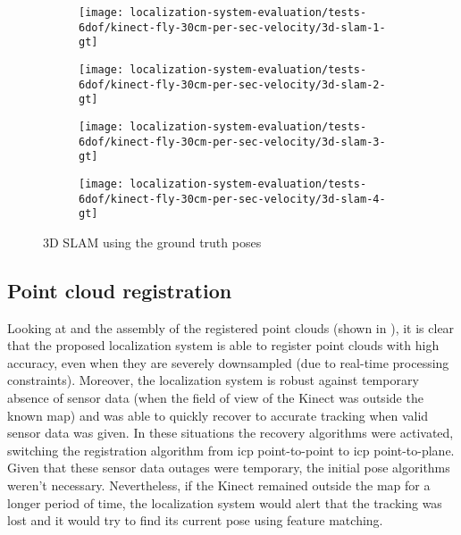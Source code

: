 \begin{figure}[H]
	\centering
	\begin{subfigure}[ht]{0.45\textwidth}
		\centering
		\texttt{[image: localization-system-evaluation/tests-6dof/kinect-fly-30cm-per-sec-velocity/3d-slam-1-gt]}
	\end{subfigure}
	\begin{subfigure}[ht]{0.45\textwidth}
		\centering
		\texttt{[image: localization-system-evaluation/tests-6dof/kinect-fly-30cm-per-sec-velocity/3d-slam-2-gt]}
	\end{subfigure}
	\begin{subfigure}[ht]{0.45\textwidth}
		\centering
		\texttt{[image: localization-system-evaluation/tests-6dof/kinect-fly-30cm-per-sec-velocity/3d-slam-3-gt]}
	\end{subfigure}
	\begin{subfigure}[ht]{0.45\textwidth}
		\centering
		\texttt{[image: localization-system-evaluation/tests-6dof/kinect-fly-30cm-per-sec-velocity/3d-slam-4-gt]}
	\end{subfigure}
	\caption{3D SLAM using the ground truth poses}
	\label{fig:localization-system-evaluation_kinect-fly-30cm-per-sec-velocity-gt-slam}
\end{figure}


\subsection{Point cloud registration}

Looking at  and the assembly of the registered point clouds (shown in ), it is clear that the proposed localization system is able to register point clouds with high accuracy, even when they are severely downsampled (due to real-time processing constraints). Moreover, the localization system is robust against temporary absence of sensor data (when the field of view of the Kinect was outside the known map) and was able to quickly recover to accurate tracking when valid sensor data was given. In these situations the recovery algorithms were activated, switching the registration algorithm from \gls{icp} point-to-point to \gls{icp} point-to-plane. Given that these sensor data outages were temporary, the initial pose algorithms weren't necessary. Nevertheless, if the Kinect remained outside the map for a longer period of time, the localization system would alert that the tracking was lost and it would try to find its current pose using feature matching.

